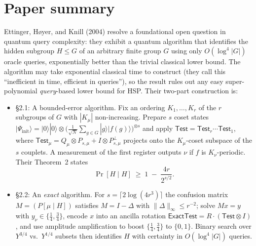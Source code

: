 \documentclass[11pt]{article}
\begin{document}
\section{Paper summary}
Ettinger, H\o yer, and Knill (2004) resolve a foundational open question in
quantum query complexity: they exhibit a quantum algorithm that identifies the
hidden subgroup $H\le G$ of an arbitrary finite group $G$ using only
$O(\log^{4}|G|)$ oracle queries, exponentially better than the trivial
classical lower bound.  The algorithm may take exponential classical time to
construct (they call this ``inefficient in time, efficient in queries''), so
the result rules out any easy super-polynomial \emph{query}-based lower bound
for HSP.  Their two-part construction is:
\begin{itemize}
  \item \S2.1: A bounded-error algorithm.  Fix an ordering
        $K_1,\dots,K_r$ of the $r$ subgroups of $G$ with $|K_\mu|$
        non-increasing.  Prepare $s$ coset states
        $|\Psi_{\text{init}}\rangle
          = |0\rangle|0\rangle \otimes
            \bigl(\tfrac1{\sqrt N}\sum_{g\in G}|g\rangle|f(g)\rangle\bigr)^{\otimes s}$
        and apply
        $\textsf{Test} = \textsf{Test}_r\cdots\textsf{Test}_1$, where
        $\textsf{Test}_\mu = Q_\mu \otimes P_{s,\mu} + I\otimes P_{s,\mu}^\perp$
        projects onto the $K_\mu$-coset subspace of the $s$ couplets.  A
        measurement of the first register outputs $\nu$ if $f$ is
        $K_\nu$-periodic.  Their Theorem~2 states
        \[
          \Pr[H\mid H]\;\ge\;1 \;-\; \frac{4r}{2^{s/2}}.
        \]
  \item \S2.2: An \emph{exact} algorithm.  For $s = \lceil 2\log(4r^3)\rceil$
        the confusion matrix $M=(P[\mu\mid H])$ satisfies $M=I-\Delta$ with
        $\|\Delta\|_{\infty} \le r^{-2}$; solve $Mx=y$ with $y_\nu \in
        \{\tfrac14,\tfrac34\}$, encode $x$ into an ancilla rotation
        $\textsf{ExactTest}=R\cdot(\textsf{Test}\otimes I)$, and use amplitude
        amplification to boost $\{\tfrac14,\tfrac34\}$ to $\{0,1\}$.  Binary
        search over $Y^{3/4}$ vs.\ $Y^{1/4}$ subsets then identifies $H$ with
        certainty in $O(\log^{4}|G|)$ queries.
\end{itemize}
\end{document}
